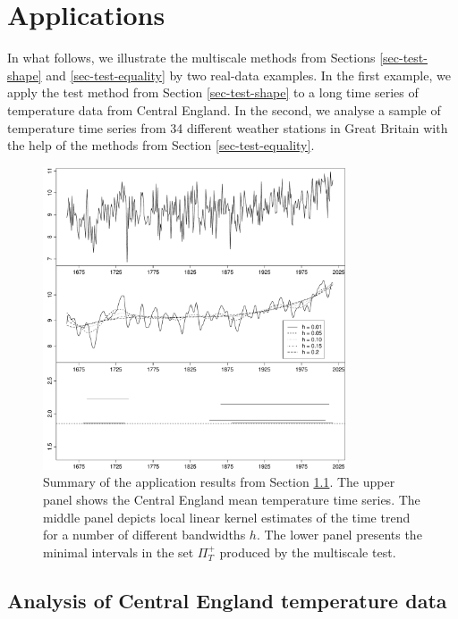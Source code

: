 \section{Applications}\label{sec-data}


In what follows, we illustrate the multiscale methods from Sections \ref{sec-test-shape} and \ref{sec-test-equality} by two real-data examples. In the first example, we apply the test method from Section \ref{sec-test-shape} to a long time series of temperature data from Central England. In the second, we analyse a sample of temperature time series from 34 different weather stations in Great Britain with the help of the methods from Section \ref{sec-test-equality}. 


\begin{figure}[t]
\centering
\includegraphics[width=0.8\textwidth]{Plots/threegraphics_testing_constant_method_ll.pdf}
\vspace{0.2cm}

\caption{Summary of the application results from Section \ref{subsec-data-1}. The upper panel shows the Central England mean temperature time series. The middle panel depicts local linear kernel estimates of the time trend for a number of different bandwidths $h$. The lower panel presents the minimal intervals in the set $\Pi_T^+$ produced by the multiscale test.}\label{plot-results-app1}
\end{figure}


\subsection{Analysis of Central England temperature data}\label{subsec-data-1} 



